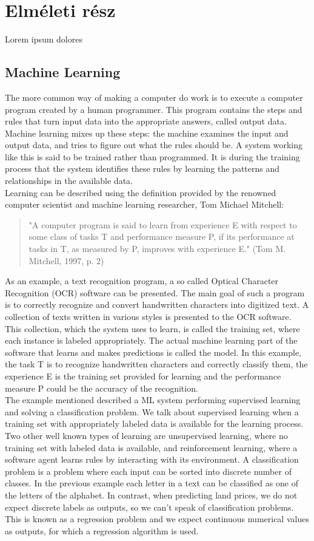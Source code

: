 \documentclass[a4paper,oneside,onecolumn,12pt]{LegrandOrangeBook}
\begin{document}
\chapter{Elméleti rész}
Lorem ipsum dolores

	\section{Machine Learning}
	The more common way of making a computer do work is to execute a computer program created by a human programmer. This program contains the steps and rules that turn input data into the appropriate answers, called output data. Machine learning mixes up these steps: the machine examines the input and output data, and tries to figure out what the rules should be. A system working like this is said to be trained rather than programmed. It is during the training process that the system identifies these rules by learning the patterns and relationships in the available data. \cite{DLP}\\
	Learning can be described using the definition provided by the renowned computer scientist and machine learning researcher, Tom Michael Mitchell:
	\begin{quote}
		"A computer program is said to learn from experience E with respect to some class of tasks T and performance measure P, if its performance at tasks in T, as measured by P, improves with experience E." (Tom M. Mitchell, 1997, p. 2)\cite{ML}
	\end{quote}
	As an example, a text recognition program, a so called Optical Character Recognition (OCR) software can be presented. The main goal of such a program is to correctly recognize and convert handwritten characters into digitized text. A collection of texts written in various styles is presented to the OCR software. This collection, which the system uses to learn, is called the training set, where each instance is labeled appropriately. The actual machine learning part of the software that learns and makes predictions is called the model. In this example, the task T is to recognize handwritten characters and correctly classify them, the experience E is the training set provided for learning and the performance measure P could be the accuracy of the recognition.\\
	The example mentioned described a ML system performing supervised learning and solving a classification problem. We talk about supervised learning when a training set with appropriately labeled data is available for the learning process. Two other well known types of learning are unsupervised learning, where no training set with labeled data is available, and reinforcement learning, where a software agent learns rules by interacting with its environment. A classification problem is a problem where each input can be sorted into discrete number of classes. In the previous example each letter in a text can be classified as one of the letters of the alphabet. In contrast, when predicting land prices, we do not expect discrete labels as outputs, so we can't speak of classification problems. This is known as a regression problem and we expect continuous numerical values as outputs, for which a regression algorithm is used.
\end{document}
